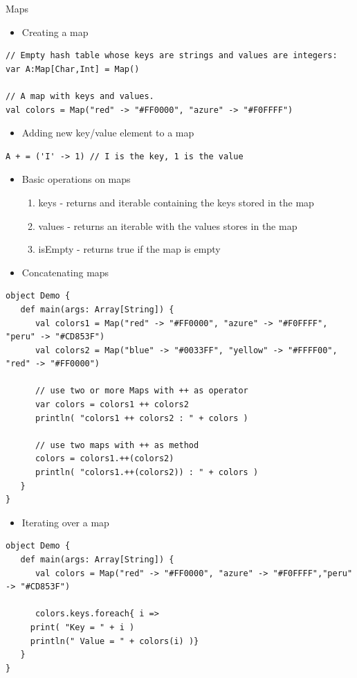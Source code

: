 \documentclass[presentation, aspectratio=169]{beamer}
\begin{document}
\begin{frame}[fragile,allowframebreaks,label=]{Maps}
 \begin{itemize}
\item Creating a map
\end{itemize}
\tiny
\begin{verbatim}
// Empty hash table whose keys are strings and values are integers:
var A:Map[Char,Int] = Map()

// A map with keys and values.
val colors = Map("red" -> "#FF0000", "azure" -> "#F0FFFF")
\end{verbatim}
\large
\begin{itemize}
\item Adding new key/value element to a map
\end{itemize}
\tiny
\begin{verbatim}
A + = ('I' -> 1) // I is the key, 1 is the value
\end{verbatim}
\large
\begin{itemize}
\item Basic operations on maps
\begin{enumerate}
\item keys - returns and iterable containing the keys stored in the map
\item values - returns an iterable with the values stores in the map
\item isEmpty - returns true if the map is empty
\end{enumerate}

\item Concatenating maps
\end{itemize}
\tiny
\begin{verbatim}
object Demo {
   def main(args: Array[String]) {
      val colors1 = Map("red" -> "#FF0000", "azure" -> "#F0FFFF", "peru" -> "#CD853F")
      val colors2 = Map("blue" -> "#0033FF", "yellow" -> "#FFFF00", "red" -> "#FF0000")

      // use two or more Maps with ++ as operator
      var colors = colors1 ++ colors2
      println( "colors1 ++ colors2 : " + colors )

      // use two maps with ++ as method
      colors = colors1.++(colors2)
      println( "colors1.++(colors2)) : " + colors )
   }
}
\end{verbatim}
\large
\begin{itemize}
\item Iterating over a map
\end{itemize}
\tiny
\begin{verbatim}
object Demo {
   def main(args: Array[String]) {
      val colors = Map("red" -> "#FF0000", "azure" -> "#F0FFFF","peru" -> "#CD853F")

      colors.keys.foreach{ i =>  
	 print( "Key = " + i )
	 println(" Value = " + colors(i) )}
   }
}
\end{verbatim}
\end{frame}
\end{document}
